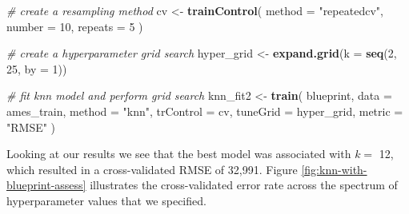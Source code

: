 \documentclass[]{krantz}
\makeatletter
\newenvironment{Shaded}{\begin{snugshade}}{\end{snugshade}}
\newcommand{\CommentTok}[1]{\textcolor[rgb]{0.37,0.37,0.37}{\textit{#1}}}
\newcommand{\DataTypeTok}[1]{\textcolor[rgb]{0.27,0.27,0.27}{#1}}
\newcommand{\DecValTok}[1]{\textcolor[rgb]{0.06,0.06,0.06}{#1}}
\newcommand{\KeywordTok}[1]{\textcolor[rgb]{0.27,0.27,0.27}{\textbf{#1}}}
\newcommand{\NormalTok}[1]{#1}
\newcommand{\StringTok}[1]{\textcolor[rgb]{0.5,0.5,0.5}{#1}}
\newenvironment{kframe}{%
\medskip{}
\setlength{\fboxsep}{.8em}
 \def\at@end@of@kframe{}%
 \ifinner\ifhmode%
  \def\at@end@of@kframe{\end{minipage}}%
  \begin{minipage}{\columnwidth}%
 \fi\fi%
 \def\FrameCommand##1{\hskip\@totalleftmargin \hskip-\fboxsep
 \colorbox{shadecolor}{##1}\hskip-\fboxsep
     \hskip-\linewidth \hskip-\@totalleftmargin \hskip\columnwidth}%
 \MakeFramed {\advance\hsize-\width
   \@totalleftmargin\z@ \linewidth\hsize
   \@setminipage}}%
 {\par\unskip\endMakeFramed%
 \at@end@of@kframe}
\renewenvironment{Shaded}{\begin{kframe}}{\end{kframe}}
\makeatother
\begin{document}
\begin{Shaded}
\begin{Highlighting}[]
\CommentTok{# create a resampling method}
\NormalTok{cv <-}\StringTok{ }\KeywordTok{trainControl}\NormalTok{(}
  \DataTypeTok{method =} \StringTok{"repeatedcv"}\NormalTok{, }
  \DataTypeTok{number =} \DecValTok{10}\NormalTok{, }
  \DataTypeTok{repeats =} \DecValTok{5}
\NormalTok{  )}

\CommentTok{# create a hyperparameter grid search}
\NormalTok{hyper_grid <-}\StringTok{ }\KeywordTok{expand.grid}\NormalTok{(}\DataTypeTok{k =} \KeywordTok{seq}\NormalTok{(}\DecValTok{2}\NormalTok{, }\DecValTok{25}\NormalTok{, }\DataTypeTok{by =} \DecValTok{1}\NormalTok{))}

\CommentTok{# fit knn model and perform grid search}
\NormalTok{knn_fit2 <-}\StringTok{ }\KeywordTok{train}\NormalTok{(}
\NormalTok{  blueprint, }
  \DataTypeTok{data =}\NormalTok{ ames_train, }
  \DataTypeTok{method =} \StringTok{"knn"}\NormalTok{, }
  \DataTypeTok{trControl =}\NormalTok{ cv, }
  \DataTypeTok{tuneGrid =}\NormalTok{ hyper_grid,}
  \DataTypeTok{metric =} \StringTok{"RMSE"}
\NormalTok{  )}
\end{Highlighting}
\end{Shaded}

Looking at our results we see that the best model was associated with \(k=\) 12, which resulted in a cross-validated RMSE of 32,991. Figure \ref{fig:knn-with-blueprint-assess} illustrates the cross-validated error rate across the spectrum of hyperparameter values that we specified.
\end{document}
